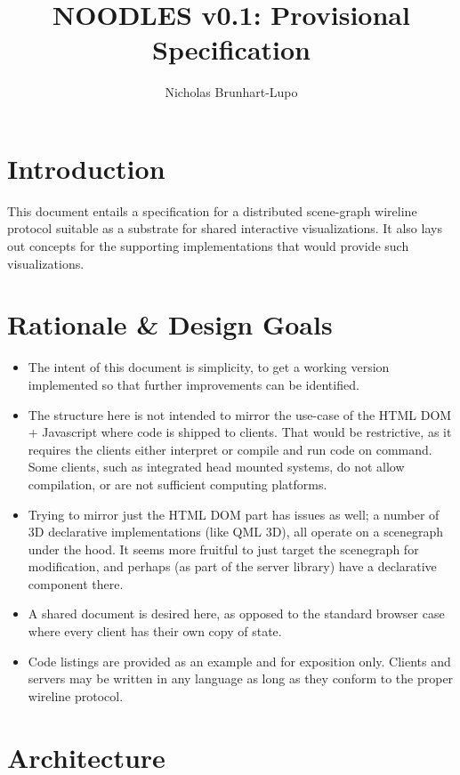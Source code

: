 \documentclass[11pt, oneside]{amsart}
\title{NOODLES v0.1: Provisional Specification}
\author{Nicholas Brunhart-Lupo}
\begin{document}
\maketitle
\tableofcontents

\section{Introduction}

This document entails a specification for a distributed scene-graph wireline protocol suitable as a substrate for shared interactive visualizations. It also lays out concepts for the supporting implementations that would provide such visualizations.


\section{Rationale \& Design Goals}

\begin{itemize}
\item The intent of this document is simplicity, to get a working version implemented so that further improvements can be identified.
\item The structure here is not intended to mirror the use-case of the HTML DOM + Javascript where code is shipped to clients. That would be restrictive, as it requires the clients either interpret or compile and run code on command. Some clients, such as integrated head mounted systems, do not allow compilation, or are not sufficient computing platforms.
\item Trying to mirror just the HTML DOM part has issues as well; a number of 3D declarative implementations (like QML 3D), all operate on a scenegraph under the hood. It seems more fruitful to just target the scenegraph for modification, and perhaps (as part of the server library) have a declarative component there.
\item A shared document is desired here, as opposed to the standard browser case where every client has their own copy of state.
\item Code listings are provided as an example and for exposition only. Clients and servers may be written in any language as long as they conform to the proper wireline protocol.
\end{itemize}


\section{Architecture}
\end{document}
